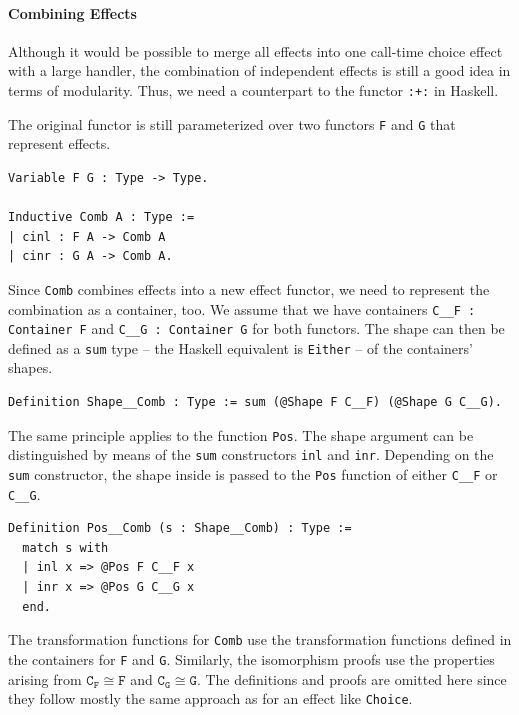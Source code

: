 \documentclass[a4paper, 11pt, fleqn, twoside, abstract=on]{scrreprt}
\newcommand{\hinl}[1]{\texttt{#1}}
\newcommand{\cinl}[1]{\texttt{#1}}
\begin{document}
\paragraph{Combining Effects}
Although it would be possible to merge all effects into one call-time choice effect with a large handler, the combination of independent effects is still a good idea in terms of modularity.
Thus, we need a counterpart to the functor \hinl{:+:} in Haskell.

The original functor is still parameterized over two functors \cinl{F} and \cinl{G} that represent effects.

\begin{verbatim}
Variable F G : Type -> Type.

Inductive Comb A : Type :=
| cinl : F A -> Comb A
| cinr : G A -> Comb A.
\end{verbatim}

Since \cinl{Comb} combines effects into a new effect functor, we need to represent the combination as a container, too.
We assume that we have containers \cinl{C__F : Container F} and \cinl{C__G : Container G} for both functors.
The shape can then be defined as a \cinl{sum} type -- the Haskell equivalent is \hinl{Either} -- of the containers' shapes.

\begin{verbatim}
Definition Shape__Comb : Type := sum (@Shape F C__F) (@Shape G C__G).
\end{verbatim}

The same principle applies to the function \cinl{Pos}.
The shape argument can be distinguished by means of the \cinl{sum} constructors \cinl{inl} and \cinl{inr}.
Depending on the \cinl{sum} constructor, the shape inside is passed to the \cinl{Pos} function of either \cinl{C__F} or \cinl{C__G}.

\begin{verbatim}
Definition Pos__Comb (s : Shape__Comb) : Type :=
  match s with
  | inl x => @Pos F C__F x
  | inr x => @Pos G C__G x
  end.
\end{verbatim}

The transformation functions for \cinl{Comb} use the transformation functions defined in the containers for \cinl{F} and \cinl{G}.
Similarly, the isomorphism proofs use the properties arising from $\texttt{C}_\texttt{F} \cong \texttt{F}$ and $\texttt{C}_\texttt{G} \cong \texttt{G}$.
The definitions and proofs are omitted here since they follow mostly the same approach as for an effect like \cinl{Choice}.
\end{document}
